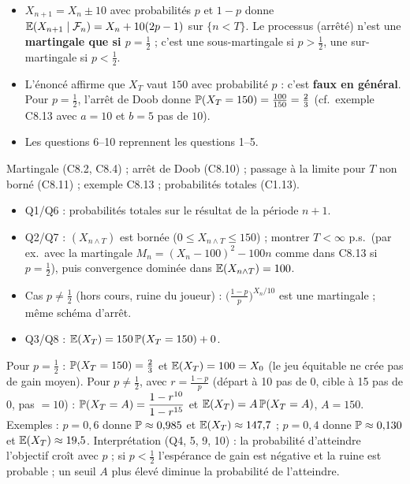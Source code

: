 \documentclass[11pt,a4paper]{article}
\begin{document}
\begin{exo}
\begin{alerte}
\begin{itemize}
  \item $X_{n+1}=X_n\pm10$ avec probabilités $p$ et $1-p$ donne $\mathbb{E}(X_{n+1}\mid\mathcal{F}_n)=X_n+10(2p-1)$ sur $\{n<T\}$. Le processus (arrêté)
  n'est une \textbf{martingale que si $p=\frac12$} ; c'est une sous-martingale si $p>\frac12$, une sur-martingale si $p<\frac12$.
  \item L'énoncé affirme que $X_T$ vaut $150$ avec probabilité $p$ : c'est \textbf{faux en général}. Pour $p=\frac12$, l'arrêt de Doob donne
  $\mathbb{P}(X_T=150)=\frac{100}{150}=\frac23$ (cf.\ exemple C8.13 avec $a=10$ et $b=5$ pas de $10$).
  \item Les questions 6--10 reprennent les questions 1--5.
\end{itemize}
\end{alerte}
\outils Martingale (C8.2, C8.4) ; arrêt de Doob (C8.10) ; passage à la limite pour $T$ non borné (C8.11) ; exemple C8.13 ; probabilités totales (C1.13).

\meth
\begin{itemize}
  \item Q1/Q6 : probabilités totales sur le résultat de la période $n+1$.
  \item Q2/Q7 : $(X_{n\wedge T})$ est bornée ($0\le X_{n\wedge T}\le150$) ; montrer $T<\infty$ p.s.\ (par ex.\ avec la martingale $M_n=(X_n-100)^2-100n$
  comme dans C8.13 si $p=\frac12$), puis convergence dominée dans $\mathbb{E}(X_{n\wedge T})=100$.
  \item Cas $p\neq\frac12$ (hors cours, ruine du joueur) : $\bigl(\frac{1-p}p\bigr)^{X_{n}/10}$ est une martingale ; même schéma d'arrêt.
  \item Q3/Q8 : $\mathbb{E}(X_T)=150\,\mathbb{P}(X_T=150)+0$.
\end{itemize}

\rep Pour $p=\frac12$ : $\mathbb{P}(X_T=150)=\frac23$ et $\mathbb{E}(X_T)=100=X_0$ (le jeu équitable ne crée pas de gain moyen).
Pour $p\neq\frac12$, avec $r=\frac{1-p}{p}$ (départ à 10 pas de 0, cible à 15 pas de 0, pas $=10$) : $\mathbb{P}(X_T=A)=\dfrac{1-r^{10}}{1-r^{15}}$ et $\mathbb{E}(X_T)=A\,\mathbb{P}(X_T=A)$, $A=150$.
Exemples : $p=0{,}6$ donne $\mathbb{P}\approx0{,}985$ et $\mathbb{E}(X_T)\approx147{,}7$ ; $p=0{,}4$ donne $\mathbb{P}\approx0{,}130$ et $\mathbb{E}(X_T)\approx19{,}5$.
Interprétation (Q4, 5, 9, 10) : la probabilité d'atteindre l'objectif croît avec $p$ ; si $p<\frac12$ l'espérance de gain est négative et
la ruine est probable ; un seuil $A$ plus élevé diminue la probabilité de l'atteindre.
\end{exo}
\end{document}
